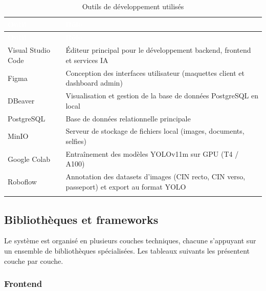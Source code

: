 \renewcommand{\arraystretch}{1.3}
\begin{longtable}{|p{4cm}|p{10.5cm}|}
  \rowcolor{bleu_principal}
  \textcolor{white}{\textbf{Outil}} & \textcolor{white}{\textbf{Rôle}} \\
  \hline
  \endfirsthead
  \rowcolor{bleu_principal}
  \textcolor{white}{\textbf{Outil}} & \textcolor{white}{\textbf{Rôle}} \\
  \hline
  \endhead
  Visual Studio Code  & Éditeur principal pour le développement backend, frontend et services IA \\ \hline
  Figma               & Conception des interfaces utilisateur (maquettes client et dashboard admin) \\ \hline
  DBeaver             & Visualisation et gestion de la base de données PostgreSQL en local \\ \hline
  PostgreSQL          & Base de données relationnelle principale \\ \hline
  MinIO               & Serveur de stockage de fichiers local (images, documents, selfies) \\ \hline
  Google Colab        & Entraînement des modèles YOLOv11m sur GPU (T4 / A100) \\ \hline
  Roboflow            & Annotation des datasets d'images (CIN recto, CIN verso, passeport) et export au format YOLO \\ \hline
  \caption{Outils de développement utilisés}
  \label{tab:ch6-outils}
\end{longtable}

\subsection{Bibliothèques et frameworks}
\label{subsec:bibliotheques}

Le système est organisé en plusieurs couches techniques, chacune s'appuyant sur un ensemble de bibliothèques spécialisées. Les tableaux suivants les présentent couche par couche.

\subsubsection{Frontend}

